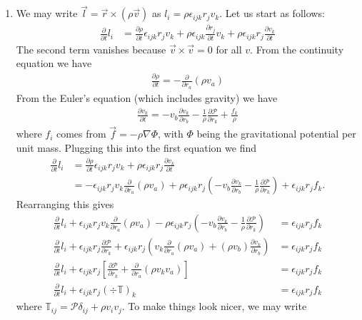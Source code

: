 \documentclass{article}
\theoremstyle{definition}
\newcommand{\p}{\partial}
\newcommand{\f}[2]{\frac{#1}{#2}}
\newcommand{\lp}{\left(}
\newcommand{\rp}{\right)}
\newcommand{\lb}{\left[}
\newcommand{\rb}{\right]}
\begin{document}
\begin{enumerate}[label=(\alph*)]
	\item We may write $\vec{l} = \vec{r}\times (\rho \vec{v})$ as $l_i = \rho \epsilon_{ijk} r_j v_k $. Let us start as follows:
	\begin{align*}
	\f{\p }{\p t} l_i &= \f{\p \rho}{\p t} \epsilon_{ijk} r_j v_k +  \rho \epsilon_{ijk} \f{\p r_j}{\p t} v_k + \rho \epsilon_{ijk} r_j \f{\p v_k}{\p t}
	\end{align*}
	The second term vanishes because $\vec{v}\times \vec{v} = 0$ for all $v$. From the continuity equation we have
	\begin{align*}
	\f{\p \rho}{\p t} = -\f{\p}{\p r_a} (\rho v_a)
	\end{align*}
	From the Euler's equation (which includes gravity) we have
	\begin{align*}
	\f{\p v_k}{\p t} = -v_b \f{\p v_k}{\p r_b} - \f{1}{\rho} \f{\p \mathcal{P}}{\p r_k} +\f{ f_k}{\rho}
	\end{align*}
	where $f_i$ comes from $\vec{f} = -\rho \nabla \Phi$, with $\Phi$ being the gravitational potential per unit mass. Plugging this into the first equation we find 
	\begin{align*}
	\f{\p }{\p t} l_i &= \f{\p \rho}{\p t} \epsilon_{ijk} r_j v_k +\rho \epsilon_{ijk} r_j \f{\p v_k}{\p t}\\
	&= -\epsilon_{ijk} r_j v_k \f{\p}{\p r_a} (\rho v_a) + \rho \epsilon_{ijk} r_j \lp -v_b \f{\p v_k}{\p r_b} - \f{1}{\rho} \f{\p \mathcal{P}}{\p r_k} \rp + \epsilon_{ijk} r_j f_k.
	\end{align*}
	Rearranging this gives
	\begin{align*}
	\f{\p }{\p t} l_i + \epsilon_{ijk} r_j v_k \f{\p}{\p r_a} (\rho v_a) - \rho \epsilon_{ijk} r_j \lp -v_b \f{\p v_k}{\p r_b} - \f{1}{\rho} \f{\p \mathcal{P}}{\p r_k} \rp &= \epsilon_{ijk} r_j f_k\\
	\f{\p }{\p t} l_i  +  \epsilon_{ijk} r_j\f{\p \mathcal{P}}{\p r_k} + \epsilon_{ijk} r_j \lp v_k \f{\p}{\p r_a}(\rho v_a) + (\rho v_b) \f{\p v_k}{\p r_b}\rp &= \epsilon_{ijk} r_j f_k \\
	\f{\p }{\p t} l_i + \epsilon_{ijk} r_j \lb  \f{\p \mathcal{P}}{\p r_k} + \f{\p }{\p r_a}(\rho v_k v_a)  \rb   &= \epsilon_{ijk} r_j f_k \\
	\f{\p}{\p t} l_i + \epsilon_{ijk} r_j (\div \mathbb{T})_k &= \epsilon_{ijk} r_j f_k 
	\end{align*}
	where $\mathbb{T}_{ij} = \mathcal{P} \delta_{ij} + \rho v_i v_j$. To make things look nicer, we may write

\end{enumerate}
\end{document}
